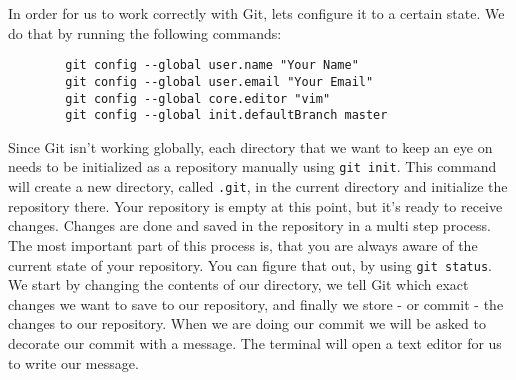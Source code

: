 \begin{challenge}
    \begin{task}
        In order for us to work correctly with Git, lets configure it to a certain state. 
        We do that by running the following commands:
        \begin{lstlisting}
        git config --global user.name "Your Name"
        git config --global user.email "Your Email"
        git config --global core.editor "vim"
        git config --global init.defaultBranch master
        \end{lstlisting}
    \end{task}

    \begin{task}
        Since Git isn't working globally, each directory that we want to keep an eye on needs to be initialized as a repository manually using \texttt{git init}.
        This command will create a new directory, called \texttt{.git}, in the current directory and initialize the repository there.
        Your repository is empty at this point, but it's ready to receive changes.
        Changes are done and saved in the repository in a multi step process.
        The most important part of this process is, that you are always aware of the current state of your repository.
        You can figure that out, by using \texttt{git status}.
        We start by changing the contents of our directory, we tell Git which exact changes we want to save to our repository, and finally we store - or commit - the changes to our repository.
        When we are doing our commit we will be asked to decorate our commit with a message.
        The terminal will open a text editor for us to write our message.
        

\end{task}
\end{challenge}
